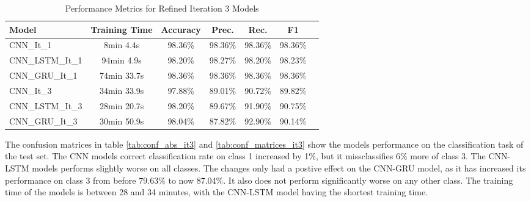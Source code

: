 \begin{table}[hbt]
    \centering
    \caption{Performance Metrics for Refined Iteration 3 Models}
    \label{tab:eval_metrics_it3}
    \begin{tabular}{lcccccc}
        \toprule
        \textbf{Model} & \textbf{Training Time} & \textbf{Accuracy} & \textbf{Prec.} & \textbf{Rec.} & \textbf{F1} \\
        \midrule
        CNN\_It\_1     & 8min 4.4s  & 98.36\% & 98.36\% & 98.36\% & 98.36\% \\
        CNN\_LSTM\_It\_1 & 94min 4.9s & 98.20\% & 98.27\% & 98.20\% & 98.23\% \\
        CNN\_GRU\_It\_1  & 74min 33.7s & 98.36\% & 98.36\% & 98.36\% & 98.36\% \\

        CNN\_It\_3      & 34min 33.9s & 97.88\% & 89.01\% & 90.72\% & 89.82\% \\
        CNN\_LSTM\_It\_3 & 28min 20.7s & 98.20\% & 89.67\% & 91.90\% & 90.75\% \\
        CNN\_GRU\_It\_3  & 30min 50.9s & 98.04\% & 87.82\% & 92.90\% & 90.14\% \\
        \bottomrule
    \end{tabular}
\end{table}

The confusion matrices in table \ref{tab:conf_abs_it3} and \ref{tab:conf_matrices_it3} show the models performance on the classification task of the test set. The CNN models correct classification rate on class 1 increased by 1\%, but it missclassifies 6\% more of class 3. The CNN-LSTM models performs slightly worse on all classes. The changes only had a postive effect on the CNN-GRU model, as it has increased its performance on class 3 from before 79.63\% to now 87.04\%. It also does not perform significantly worse on any other class. The training time of the models is between 28 and 34 minutes, with the CNN-LSTM model having the shortest training time.

